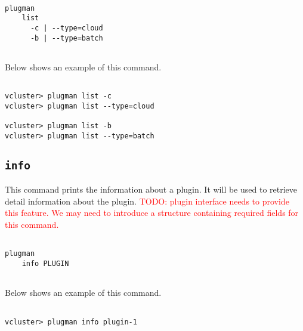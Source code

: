 \documentclass[11pt]{article}
\def \ttt{\texttt}
\begin{document}
\begin{Verbatim}[fontfamily=courier, fontsize = \small, obeytabs
=true, tabsize=4, frame=lines]

plugman 
    list
      -c | --type=cloud 
      -b | --type=batch
      
\end{Verbatim}

Below shows an example of this command.

\begin{Verbatim}[fontfamily=courier, fontsize = \small, obeytabs
=true, tabsize=4, frame=lines]

vcluster> plugman list -c
vcluster> plugman list --type=cloud

vcluster> plugman list -b
vcluster> plugman list --type=batch

\end{Verbatim}


\subsection{\ttt{info}}
This command prints the information about a plugin. It will be used to retrieve detail information about the plugin. \textcolor{red}{TODO: plugin interface needs to provide this feature. We may need to introduce a structure containing required fields for this command.}

\begin{Verbatim}[fontfamily=courier, fontsize = \small, obeytabs
=true, tabsize=4, frame=lines]

plugman 
    info PLUGIN
      
\end{Verbatim}

Below shows an example of this command.

\begin{Verbatim}[fontfamily=courier, fontsize = \small, obeytabs
=true, tabsize=4, frame=lines]

vcluster> plugman info plugin-1
      
\end{Verbatim}
\end{document}
